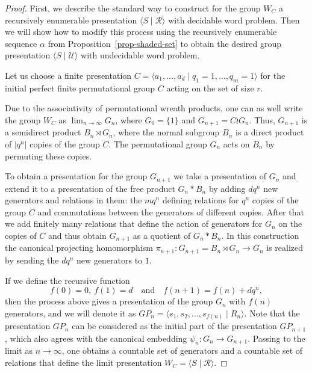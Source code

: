 \documentclass[10pt,a4paper]{amsart}
\begin{document}
\begin{proof}
First, we describe the standard way to construct for the group $W_C$ a recursively enumerable presentation $\langle S \mid \mathcal R \rangle$ with decidable word problem. Then we will show how to modify this process using the recursively enumerable sequence $\alpha$ from Proposition~\ref{prop-shaded-set} to obtain the desired group presentation $\langle S \mid \mathcal U \rangle$ with undecidable word problem.

\smallskip

Let us choose a finite presentation $C=\langle a_1,\ldots,a_d \mid q_1=1, \ldots,q_m=1 \rangle$ for the initial perfect finite permutational group $C$ acting on the set of size $r$. 

Due to the associativity of permutational wreath products, one can as well write the group $W_C$ as $\lim_{n\to \infty} G_n$, where $G_0=\{1\}$ and $G_{n+1}= C \wr G_{n}$. Thus, $G_{n+1}$ is a semidirect product $B_n \rtimes G_n$, where the normal subgroup $B_n$ is a direct product of $|q^n|$ copies of the group $C$. The permutational group $G_n$ acts on $B_n$ by permuting these copies. 

To obtain a presentation for the group $G_{n+1}$ we take a presentation of $G_n$ and extend it to a presentation of the free product $G_{n}*B_n$ by adding $dq^n$ new generators and relations in them: the $mq^n$ defining relations for $q^n$ copies of the group $C$ and commutations between the generators of different copies. After that we add finitely many relations that define the action of generators for $G_n$ on the copies of $C$ and thus obtain $G_{n+1}$ as a quotient of $G_{n}*B_n$. In this construction the canonical projecting homomorphism $\pi_{n+1}: G_{n+1}=B_n \rtimes G_n \to G_n$ is realized by sending the $dq^n$ new generators to $1$. 

If we define the recursive function
\begin{equation}
f(0)=0, \ f(1)=d \quad \text{and} \quad  f(n+1)=f(n)+dq^n,
\end{equation}
then the process above gives a presentation of the group $G_n$ with $f(n)$ generators, and we will denote it as $GP_n=\langle s_1,s_2,\ldots,s_{f(n)} \mid R_n \rangle$. Note that the presentation $GP_n$ can be considered as the initial part of the presentation $GP_{n+1}$, which also agrees with the canonical embedding $\psi_n:G_n\to G_{n+1}$. Passing to the limit as $n\to\infty$, one obtains a countable set of generators and a countable set of relations that define the limit presentation $W_C=\langle S \mid \mathcal R \rangle$.



\end{proof}
\end{document}
